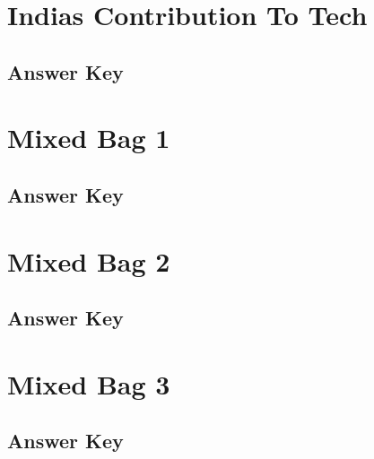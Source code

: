\documentclass[12pt,a4paper]{book}
\newcounter{totalcounter}
\begin{document}


\setcounter{totalcounter}{1}

\section{Indias Contribution To Tech}



\subsection*{Answer Key}



\setcounter{totalcounter}{1}

\section{Mixed Bag 1}



\subsection*{Answer Key}



\setcounter{totalcounter}{1}

\section{Mixed Bag 2}



\subsection*{Answer Key}



\setcounter{totalcounter}{1}

\section{Mixed Bag 3}



\subsection*{Answer Key}
\end{document}
